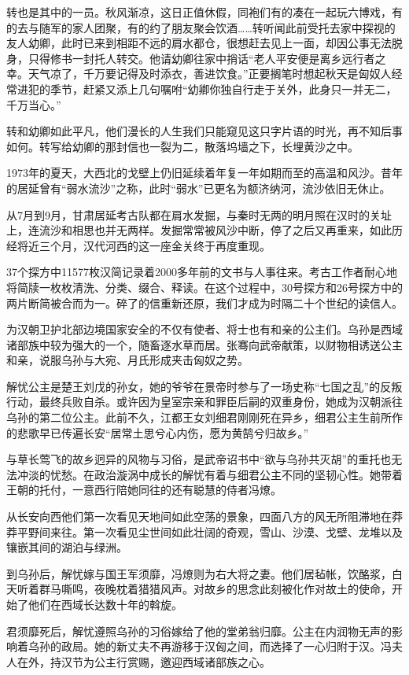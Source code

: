 转也是其中的一员。秋风渐凉，这日正值休假，同袍们有的凑在一起玩六博戏，有的去与随军的家人团聚，有的约了朋友聚会饮酒……转听闻此前受托去家中探视的友人幼卿，此时已来到相距不远的肩水都仓，很想赶去见上一面，却因公事无法脱身，只得修书一封托人转交。他请幼卿往家中捎话“老人平安便是离乡远行者之幸。天气凉了，千万要记得及时添衣，善进饮食。”正要搁笔时想起秋天是匈奴人经常进犯的季节，赶紧又添上几句嘱咐“幼卿你独自行走于关外，此身只一并无二，千万当心。”

转和幼卿如此平凡，他们漫长的人生我们只能窥见这只字片语的时光，再不知后事如何。转写给幼卿的那封信也一裂为二，散落坞墙之下，长埋黄沙之中。

1973年的夏天，大西北的戈壁上仍旧延续着年复一年如期而至的高温和风沙。昔年的居延曾有“弱水流沙”之称，此时“弱水”已更名为额济纳河，流沙依旧无休止。

从7月到9月，甘肃居延考古队都在肩水发掘，与秦时无两的明月照在汉时的关址上，连流沙和相思也并无两样。发掘常常被风沙中断，停了之后又再重来，如此历经将近三个月，汉代河西的这一座金关终于再度重现。

37个探方中11577枚汉简记录着2000多年前的文书与人事往来。考古工作者耐心地将简牍一枚枚清洗、分类、缀合、释读。在这个过程中，30号探方和26号探方中的两片断简被合而为一。碎了的信重新还原，我们才成为时隔二十个世纪的读信人。

为汉朝卫护北部边境国家安全的不仅有使者、将士也有和亲的公主们。乌孙是西域诸部族中较为强大的一个，随畜逐水草而居。张骞向武帝献策，以财物相诱送公主和亲，说服乌孙与大宛、月氏形成夹击匈奴之势。

解忧公主是楚王刘戊的孙女，她的爷爷在景帝时参与了一场史称“七国之乱”的反叛行动，最终兵败自杀。或许因为皇室宗亲和罪臣后嗣的双重身份，她成为汉朝派往乌孙的第二位公主。此前不久，江都王女刘细君刚刚死在异乡，细君公主生前所作的悲歌早已传遍长安“居常土思兮心内伤，愿为黄鹄兮归故乡。”

与草长莺飞的故乡迥异的风物与习俗，是武帝诏书中“欲与乌孙共灭胡”的重托也无法冲淡的忧愁。在政治漩涡中成长的解忧有着与细君公主不同的坚韧心性。她带着王朝的托付，一意西行陪她同往的还有聪慧的侍者冯燎。

从长安向西他们第一次看见天地间如此空荡的景象，四面八方的风无所阻滞地在莽莽平野间来往。第一次看见尘世间如此壮阔的奇观，雪山、沙漠、戈壁、龙堆以及镶嵌其间的湖泊与绿洲。

到乌孙后，解忧嫁与国王军须靡，冯燎则为右大将之妻。他们居毡帐，饮酪浆，白天听着群马嘶鸣，夜晚枕着猎猎风声。对故乡的思念此刻被化作对故土的使命，开始了他们在西域长达数十年的斡旋。

君须靡死后，解忧遵照乌孙的习俗嫁给了他的堂弟翁归靡。公主在内润物无声的影响着乌孙的政局。她的新丈夫不再游移于汉匈之间，而选择了一心归附于汉。冯夫人在外，持汉节为公主行赏赐，邀迎西域诸部族之心。

